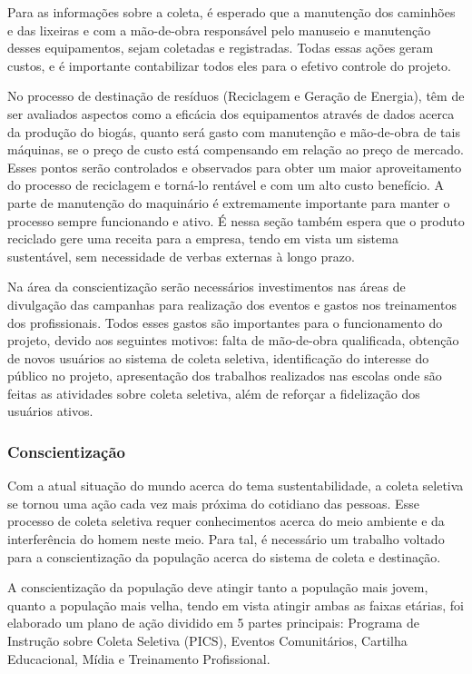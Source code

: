    Para as informações sobre a coleta, é esperado que a manutenção dos caminhões e das lixeiras e com a mão-de-obra responsável pelo manuseio e manutenção desses equipamentos, sejam coletadas e registradas. Todas essas ações geram custos, e é importante contabilizar todos eles para o efetivo controle do projeto.

   No processo de destinação de resíduos (Reciclagem e Geração de Energia), têm de ser avaliados aspectos como a eficácia dos equipamentos através de dados acerca da produção do biogás, quanto será gasto com manutenção e mão-de-obra de tais máquinas, se o preço de custo está compensando em relação ao preço de mercado. Esses pontos serão controlados e observados para obter um maior aproveitamento do processo de reciclagem e torná-lo rentável e com um alto custo benefício. A parte de manutenção do maquinário é extremamente importante para manter o processo sempre funcionando e ativo. É nessa seção também espera que o produto reciclado gere uma receita para a empresa, tendo em vista um sistema sustentável, sem necessidade de verbas externas à longo prazo.

   Na área da conscientização serão necessários investimentos nas áreas de divulgação das campanhas para realização dos eventos e gastos nos treinamentos dos profissionais. Todos esses gastos são importantes para o funcionamento do projeto, devido aos seguintes motivos: falta de mão-de-obra qualificada, obtenção de novos usuários ao sistema de coleta seletiva, identificação do interesse do público no projeto, apresentação dos trabalhos realizados nas escolas onde são feitas as atividades sobre coleta seletiva, além de reforçar a fidelização dos usuários ativos.

   \subsubsection{Conscientização}

   Com a atual situação do mundo acerca do tema sustentabilidade, a coleta seletiva se tornou uma ação cada vez mais próxima do cotidiano das pessoas. Esse processo de coleta seletiva requer conhecimentos acerca do meio ambiente e da interferência do homem neste meio. Para tal, é necessário um trabalho voltado para a conscientização da população acerca do sistema de coleta e destinação.

   A conscientização da população deve atingir tanto a população mais jovem, quanto a população mais velha, tendo em vista atingir ambas as faixas etárias, foi elaborado um plano de ação dividido em 5 partes principais: Programa de Instrução sobre Coleta Seletiva (PICS), Eventos Comunitários, Cartilha Educacional, Mídia e Treinamento Profissional.

